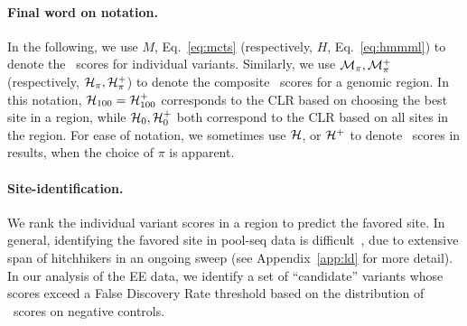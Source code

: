\paragraph{Final word on notation.}
In the following, we use $M$, Eq.~\ref{eq:mcts} (respectively, $H$,
Eq.~\ref{eq:hmmml}) to denote the \comale\ scores for individual
variants. Similarly, we use ${\cal M}_{\pi},{\cal M}^{+}_{\pi}$ (respectively,
${\cal H}_{\pi},{\cal H}^{+}_{\pi}$) to denote the composite \comale\ scores for
a genomic region. In this notation, ${\cal H}_{100}={\cal
  H}^{+}_{100}$ corresponds to the CLR based on choosing the best site
in a region, while ${\cal H}_0,{\cal H}^{+}_0$ both correspond to the CLR based
on all sites in the region. For ease of notation, we sometimes use
${\cal H}$, or ${\cal H}^{+}$ to denote \comale\ scores in results, when the
choice of $\pi$ is apparent.

\paragraph{Site-identification.} 
We rank the individual variant scores in a region to predict the
favored site. In general, identifying the favored site in pool-seq
data is difficult~\cite{tobler2014massive}, due to extensive span of
hitchhikers in an ongoing sweep (see Appendix~\ref{app:ld} for more
detail). In our analysis of the \dmel EE data, we identify a set of
``candidate'' variants whose scores exceed a False Discovery Rate
threshold based on the distribution of \comale\ scores on negative
controls.

